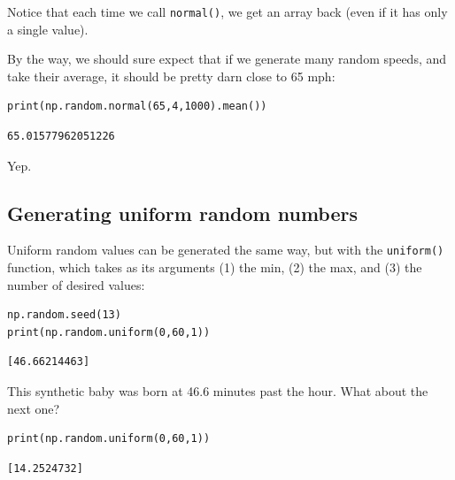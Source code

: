 Notice that each time we call \texttt{normal()}, we get an array back (even if
it has only a single value).

By the way, we should sure expect that if we generate many random speeds, and
take their average, it should be pretty darn close to 65 mph:

\begin{Verbatim}[fontsize=\small,samepage=true,frame=single,framesep=3mm]
print(np.random.normal(65,4,1000).mean())                        
\end{Verbatim}

\begin{Verbatim}[fontsize=\small,samepage=true,frame=leftline,framesep=5mm,framerule=1mm]
65.01577962051226
\end{Verbatim}

Yep.

\subsection{Generating uniform random numbers}


Uniform random values can be generated the same way, but with the
\texttt{uniform()} function, which takes as its arguments (1) the min, (2) the
max, and (3) the number of desired values:

\begin{Verbatim}[fontsize=\small,samepage=true,frame=single,framesep=3mm]
np.random.seed(13)
print(np.random.uniform(0,60,1))
\end{Verbatim}
\vspace{-.2in}

\begin{Verbatim}[fontsize=\small,samepage=true,frame=leftline,framesep=5mm,framerule=1mm]
[46.66214463]
\end{Verbatim}

This synthetic baby was born at 46.6 minutes past the hour. What about the next
one?


\begin{Verbatim}[fontsize=\small,samepage=true,frame=single,framesep=3mm]
print(np.random.uniform(0,60,1))
\end{Verbatim}
\vspace{-.2in}

\begin{Verbatim}[fontsize=\small,samepage=true,frame=leftline,framesep=5mm,framerule=1mm]
[14.2524732]
\end{Verbatim}

